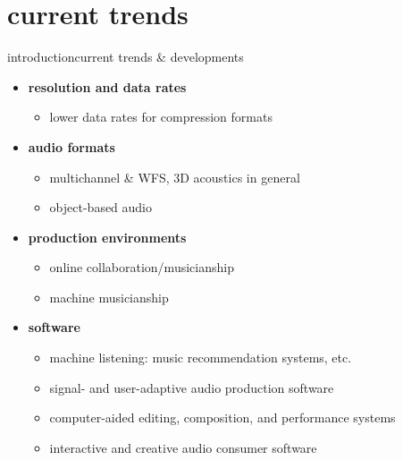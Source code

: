 \section{current trends}
\begin{frame}{introduction}{current trends \& developments}
	\begin{itemize}
		\item	\textbf{resolution and data rates}
			\begin{itemize}
				\item	lower data rates for compression formats
			\end{itemize}
		\smallskip
        \item<2->   \textbf{audio formats}
			\begin{itemize}
				\item	multichannel \& WFS, 3D acoustics in general
                \item   object-based audio
			\end{itemize}
		\smallskip
        \item<3->   \textbf{production environments}
			\begin{itemize}
				\item	online collaboration/musicianship
                \item   machine musicianship
			\end{itemize}
		\smallskip
        \item<4->   \textbf{software}
			\begin{itemize}
				\item	machine listening:  music recommendation systems, etc.
				\item	signal- and user-adaptive audio production software
				\item	computer-aided editing, composition, and performance systems
                \item   interactive and creative audio consumer software
			\end{itemize}
	\end{itemize}
\end{frame}
